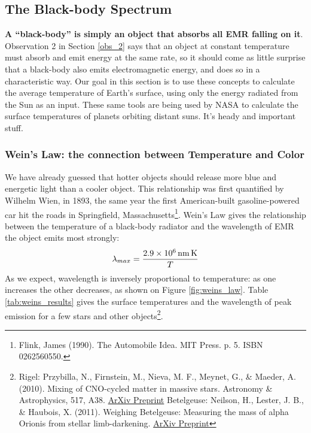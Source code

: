 \documentclass[amstex,12pt]{book}
\begin{document}
\subsection{The Black-body Spectrum}
\textbf{A ``black-body'' is simply an object that absorbs all EMR falling on it}. Observation 2 in Section \ref{obs_2} says that an object at constant temperature must absorb and emit energy at the same rate, so it should come as little surprise that a black-body also emits electromagnetic energy, and does so in a characteristic way. Our goal in this section is to use these concepts to calculate the average temperature of Earth's surface, using only the energy radiated from the Sun as an input. These same tools are being used by NASA to calculate the surface temperatures of planets orbiting distant suns. It's heady and important stuff.

\subsubsection{Wein’s Law: the connection between Temperature and Color}
We have already guessed that hotter objects should release more blue and energetic light than a cooler object. This relationship was first quantified by Wilhelm Wien, in 1893, the same year the first American-built gasoline-powered car hit the roads in Springfield, Massachusetts\footnote{Flink, James (1990). The Automobile Idea. MIT Press. p. 5. ISBN 0262560550.}. Wein's Law gives the relationship between the temperature of a black-body radiator and the wavelength of EMR the object emits most strongly:
\begin{equation}
	\lambda_{max}=\frac{\SI{2.9d6}{\nano\metre\kelvin}}{T}
\end{equation}
As we expect, wavelength is inversely proportional to temperature: as one increases the other decreases, as shown on Figure \ref{fig:weins_law}. Table \ref{tab:weins_results} gives the surface temperatures and the wavelength of peak emission for a few stars and other objects\footnote{Rigel: Przybilla, N., Firnstein, M., Nieva, M. F., Meynet, G., \& Maeder, A. (2010). Mixing of CNO-cycled matter in massive stars. Astronomy \& Astrophysics, 517, A38. \href{https://arxiv.org/abs/1005.2278}{ArXiv Preprint} Betelgeuse: Neilson, H., Lester, J. B., \& Haubois, X. (2011). Weighing Betelgeuse: Measuring the mass of alpha Orionis from stellar limb-darkening. \href{https://arxiv.org/abs/1109.4562}{ArXiv Preprint}}.
\end{document}
